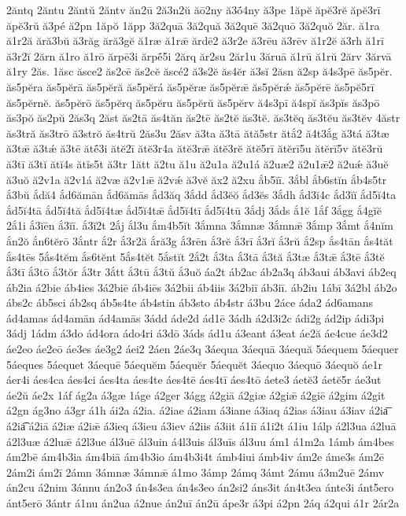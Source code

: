 {2ăntq
2ăntu
2ăntŭ
2ăntv
ăn2ū
2ă3n2ŭ
ăō2ny
ă3ṓ4ny
ă3pe
1ăpĕ
ăpĕ3rĕ
ăpĕ3rī
ăpĕ3rŭ
ă3pé
ă2pn
1ăpŏ
1ăpp
3ă2quā
3ă2quă
3ă2quē
3ă2quō
3ă2quŏ
2ăr.
ă1ra
ă1r2ă
ără3bŭ
ă3răg
ără3gĕ
ă1ræ
ă1rǣ
ărdē2
ă3r2e
ă3rēu
ă3rēv
ă1r2ĕ
ă3rh
ă1rī
ă3r2ĭ
2ărn
ă1ro
ă1rō
ărpē3i
ărpḗ5i
2ărq
ăr2su
2ăr1u
3ăruā
ă1rū
ă1rŭ
2ărv
3ărvā
ă1ry
2ăs.
1ăsc
ăsce2
ăs2cē
ăs2cĕ
ăscé2
ă3s2ĕ
ăs4ĕr
ă3sĭ
2ăsn
ă2sp
ă4s3pē
ăs5pĕr.
ăs5pĕra
ăs5pĕrā
ăs5pĕră
ăs5pĕrá
ăs5pĕræ
ăs5pĕrǣ
ăs5pĕrǽ
ăs5pĕrē
ăs5pĕ5rī
ăs5pĕrnĕ.
ăs5pĕrō
ăs5pĕrq
ăs5pĕru
ăs5pĕrŭ
ăs5pĕrv
ă4s3pī
ă4spĭ
ăs3pĭs
ăs3pō
ăs3pŏ
ăs2pŭ
2ăs3q
2ăst
ăs2tā
ăs4tăn
ăs2tē
ăs2tĕ
ăs3tĕ.
ăs3tĕq
ăs3tĕu
ăs3tĕv
4ăstr
ăs3tră
ăs3trō
ă3strŏ
ăs4trŭ
2ăs3u
2ăsv
ă3ta
ă3tā
ătă5str
ătắ2
ă4t3ắg
ă3tá
ă3tæ
ă3tǣ
ă3tǽ
ă3tē
ătḗ3i
ătĕ2ī
ătĕ3r4a
ătĕ3rǣ
ătĕ3rĕ
ătĕ5rī
ătĕrī5u
ătĕrī5v
ătĕ3rŭ
ă3tī
ă3tĭ
ătĭ4s
ătĭs5t
ă3tr
1ătt
ă2tu
ă1u
ă2u1a
ă2u1á
ă2uæ2
ă2u1ǣ2
ă2uǽ
ă3uĕ
ă3uŏ
ă2v1a
ă2v1á
ă2væ
ă2v1ǣ
ă2vǽ
ă3vĕ
ăx2
ă2xu
ắb5ĭī.
3ắbl
ắb6stĭn
ắb4s5tr
ắ3bŭ
ắdă4
ắd6ămān
ắd6ămās
ắd3ăq
3ắdd
ắd3ĕŏ
ắd3ĕs
3ắdh
ắd3ĭ4c
ắd3ĭĭ
ắd5ĭ4ta
ắd5ĭ4tā
ắd5ĭ4tă
ắd5ĭ4tæ
ắd5ĭ4tǣ
ắd5ĭ4tī
ắd5ĭ4tū
3ắdj
3ắds
ắ1ĕ
1ắf
3ắgg
ắ4gĭĕ
2ắ1i
ắ3ĭēn
ắ3ĭī.
ắ3ĭ2t
2ắj
ắl3u
ắm4b5ĭt
3ắmna
3ắmnæ
3ắmnǣ
3ắmp
3ắmt
ắ4nĭm
ắn2ŏ
ắn6tĕrō
3ắntr
ắ2r
ắ3r2ă
ắră3g
ắ3rēn
ắ3rĕ
ắ3rī
ắ3rĭ
ắ3rŭ
ắ2sp
ắs4tān
ắs4tăt
ắs4tēs
5ắs4tĕm
ắs6tĕnt
5ắs4tĕt
5ắstĭt
2ắ2t
ắ3ta
ắ3tā
ắ3tă
ắ3tæ
ắ3tǣ
ắ3tē
ắ3tĕ
ắ3tī
ắ3tō
ắ3tŏr
ắ3tr
3ắtt
ắ3tū
ắ3tŭ
ắ3uŏ
áa2t
áb2ac
áb2a3q
áb3aui
áb3avi
áb2eq
áb2ia
á2bie
áb4ies
3á2biē
áb4iēs
3á2bii
áb4iis
3á2biī
áb3iī.
áb2iu
1ábī
3á2bl
áb2o
ábs2c
áb5sci
áb2sq
áb5s4te
áb4stin
áb3sto
áb4str
á3bu
2áce
áda2
ád6amans
ád4amas
ád4amān
ád4amās
3ádd
áde2d
ád1ē
3ádh
á2d3i2c
ádi2g
ád2ip
ádi3pi
3ádj
1ádm
á3do
ád4ora
ádo4ri
á3dō
3áds
ád1u
á3eant
á3eat
áe2ă
áe4cue
áe3d2
áe2eo
áe2eō
áe3es
áe3g2
áei2
2áen
2áe3q
3áequa
3áequā
3áequă
5áequem
5áequer
5áeques
5áequet
3áequē
5áequĕm
5áequĕr
5áequĕt
3áequo
3áequō
3áequŏ
áe1r
áer4i
áes4ca
áes4ci
áes4ta
áes4te
áes4tē
áes4tī
áes4tō
áete3
áetĕ3
áetĕ5r
áe3ut
áe2ŭ
áe2x
1áf
ág2a
á3gæ
1áge
á2ger
3ágg
á2giā
á2giæ
á2giǣ
á2giē
á2gim
á2git
á2gn
ág3no
á3gr
á1h
ái2a
á2ia.
á2iae
á2iam
á3iane
á3iaq
á2ias
á3iau
á3iav
á2ia͞
á2ia͡
á2iā
á2iæ
á2iǣ
á3ieq
á3ieu
á3iev
á2iis
á3iit
á1iī
á1i2t
á1iu
1álp
á2l3ua
á2luā
á2l3uæ
á2luǣ
á2l3ue
ál3uē
ál3uin
á4l3uis
ál3uīs
ál3uu
ám1
á1m2a
1ámb
ám4bes
ám2bē
ám4b3ia
ám4biā
ám4b3io
ám4b3i4t
ámb4iui
ámb4iv
ám2e
áme3s
ám2ē
2ám2i
ám2ī
2ámn
3ámnæ
3ámnǣ
á1mo
3ámp
2ámq
3ámt
2ámu
á3m2uē
2ámv
án2cu
á2nim
3ánnu
án2o3
án4s3ea
án4s3eo
án2si2
áns3it
án4t3ea
ánte3i
ánt5ero
ánt5erō
3ántr
á1nu
án2ua
á2nue
án2uī
án2ū
ápe3r
á3pi
á2pn
2áq
á2qui
á1r
2ár2a
}
